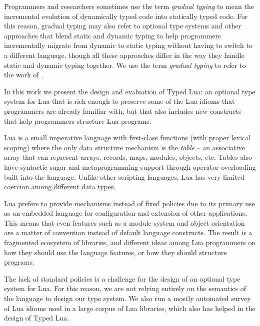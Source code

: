 Programmers and researchers sometimes use the term \emph{gradual typing}
to mean the incremental evolution of dynamically typed code into
statically typed code.
For this reason, gradual typing may also refer to optional type
systems and other approaches that blend static and dynamic typing to
help programmers incrementally migrate from dynamic to static typing
without having to switch to a different language, though all these
approaches differ in the way they handle static and dynamic typing
together.
We use the term \emph{gradual typing} to refer to the work of
\citet{siek2006gradual}.

In this work we present the design and evaluation of Typed Lua:
an optional type system for Lua that is rich enough to
preserve some of the Lua idioms that programmers are already familiar with,
but that also includes new constructs that help programmers
structure Lua programs.

Lua is a small imperative language with first-class functions
(with proper lexical scoping) where the only data structure
mechanism is the \emph{table} --
an associative array that can represent arrays, records, maps, modules, objects, etc.
Tables also have syntactic sugar and metaprogramming support
through operator overloading built into the language.
Unlike other scripting languages, Lua has very limited coercion
among different data types.

Lua prefers to provide mechanisms instead of fixed policies due
to its primary use as an embedded language for configuration and
extension of other applications.
This means that even features such as a module system and
object orientation are a matter of convention instead of default
language constructs.
The result is a fragmented ecosystem of libraries, and different
ideas among Lua programmers on how they should use the language
features, or how they should structure programs.

The lack of standard policies is a challenge for the design of
an optional type system for Lua.
For this reason, we are not relying entirely on the semantics of
the language to design our type system.
We also run a mostly automated survey of Lua idioms used in a
large corpus of Lua libraries, which also has helped in the design of Typed Lua.

